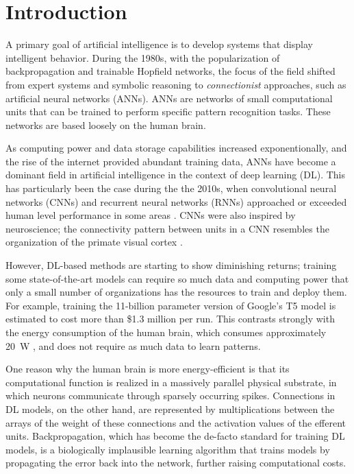 \chapter{Introduction}\label{ch:introduction}

A primary goal of artificial intelligence is to develop systems that display intelligent behavior.
During the 1980s, with the popularization of backpropagation and trainable Hopfield networks, the focus of the field shifted from expert systems and symbolic reasoning to \emph{connectionist} approaches, such as artificial neural networks (ANNs).
ANNs are networks of small computational units that can be trained to perform specific pattern recognition tasks.
These networks are based loosely on the human brain.

As computing power and data storage capabilities increased exponentionally, and the rise of the internet provided abundant training data, ANNs have become a dominant field in artificial intelligence in the context of deep learning (DL).
This has particularly been the case during the the 2010s, when convolutional neural networks (CNNs) and recurrent neural networks (RNNs) approached or exceeded human level performance in some areas \citep{schmidhuber2015deep}.
CNNs were also inspired by neuroscience; the connectivity pattern between units in a CNN resembles the organization of the primate visual cortex \citep{hubel1968receptive}.

However, DL-based methods are starting to show diminishing returns; training some state-of-the-art models can require so much data and computing power that only a small number of organizations has the resources to train and deploy them.
For example, training the 11-billion parameter version of Google's T5 model \citep{raffel2019exploring} is estimated to cost more than \$1.3 million per run\cite{sharir2020cost}.
This contrasts strongly with the energy consumption of the human brain, which consumes approximately \SI{20}{\watt} \citep{sokoloff1960metabolism}, and does not require as much data to learn patterns.

One reason why the human brain is more energy-efficient is that its computational function is realized in a massively parallel physical substrate, in which neurons communicate through sparsely occurring spikes.
Connections in DL models, on the other hand, are represented by multiplications between the arrays of the weight of these connections and the activation values of the efferent units.
Backpropagation, which has become the de-facto standard for training DL models, is a biologically implausible learning algorithm that trains models by propagating the error back into the network, further raising computational costs.

